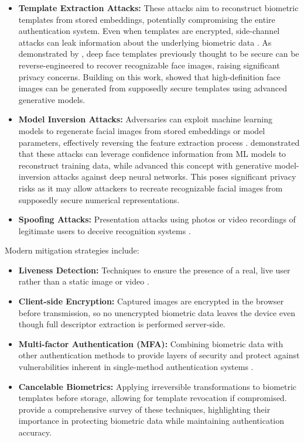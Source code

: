 \begin{itemize}
\item \textbf{Template Extraction Attacks:} These attacks aim to reconstruct biometric templates from stored embeddings, potentially compromising the entire authentication system. Even when templates are encrypted, side-channel attacks can leak information about the underlying biometric data \autocite{Mai2019, Dong2021}. As demonstrated by \textcite{Mai2019}, deep face templates previously thought to be secure can be reverse-engineered to recover recognizable face images, raising significant privacy concerns. Building on this work, \textcite{Dong2021} showed that high-definition face images can be generated from supposedly secure templates using advanced generative models.

\clearpage

\item \textbf{Model Inversion Attacks:} Adversaries can exploit machine learning models to regenerate facial images from stored embeddings or model parameters, effectively reversing the feature extraction process \autocite{Fredrikson2015, Zhang2020}. \textcite{Fredrikson2015} demonstrated that these attacks can leverage confidence information from ML models to reconstruct training data, while \textcite{Zhang2020} advanced this concept with generative model-inversion attacks against deep neural networks. This poses significant privacy risks as it may allow attackers to recreate recognizable facial images from supposedly secure numerical representations.

\item \textbf{Spoofing Attacks:} Presentation attacks using photos or video recordings of legitimate users to deceive recognition systems \autocite{Kuznetsov2024}.
\end{itemize}

Modern mitigation strategies include:
\begin{itemize}
\item \textbf{Liveness Detection:} Techniques to ensure the presence of a real, live user rather than a static image or video \autocite{Kuznetsov2024}.

\item \textbf{Client-side Encryption:} Captured images are encrypted in the browser before transmission, so no unencrypted biometric data leaves the device even though full descriptor extraction is performed server-side.

\item \textbf{Multi-factor Authentication (MFA):} Combining biometric data with other authentication methods to provide layers of security and protect against vulnerabilities inherent in single-method authentication systems \autocite{Furnell2022}.

\item \textbf{Cancelable Biometrics:} Applying irreversible transformations to biometric templates before storage, allowing for template revocation if compromised. \textcite{Rathgeb2011} provide a comprehensive survey of these techniques, highlighting their importance in protecting biometric data while maintaining authentication accuracy.
\end{itemize}

